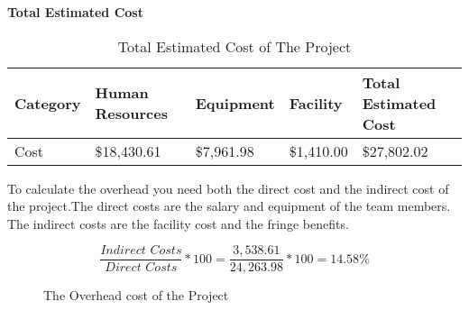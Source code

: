\begin{table}[H]
    \centering
    \textbf{Total Estimated Cost}
    \begin{tabular}{||m{}|m{}|m{}|m{}|m{}||}
        \hline
        Category & Human Resources & Equipment & Facility & Total Estimated Cost\\
        \hline
        Cost & \$18,430.61 & \$7,961.98 & \$1,410.00 & \$27,802.02\\
        \hline
    \end{tabular}
    \caption {Total Estimated Cost of The Project}
       \label{table:6}
\end{table}
To calculate the overhead you need both the direct cost and the indirect cost of the project.The direct costs are the salary and equipment of the team members. The indirect costs are the facility cost and the fringe benefits.\\
\begin{figure}[h]
    $$\frac{\textit{Indirect Costs}}{\textit{Direct Costs}} * 100 = \frac{3,538.61}{24,263.98} * 100 = 14.58\%$$
 \caption{The Overhead cost of the Project}
 \end{figure}